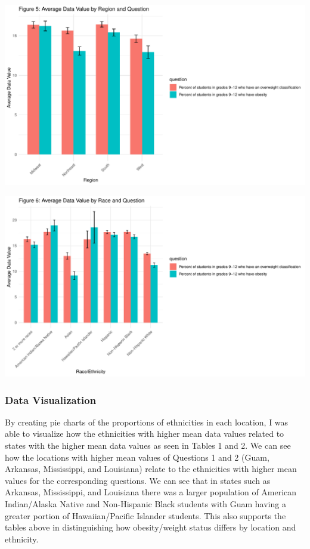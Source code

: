\documentclass[
]{article}
\begin{document}
\includegraphics{FinalPM566---Rmarkdown_files/figure-latex/unnamed-chunk-27-1.pdf}

\includegraphics{FinalPM566---Rmarkdown_files/figure-latex/unnamed-chunk-28-1.pdf}

\subsubsection{Data Visualization}\label{data-visualization}

By creating pie charts of the proportions of ethnicities in each
location, I was able to visualize how the ethnicities with higher mean
data values related to states with the higher mean data values as seen
in Tables 1 and 2. We can see how the locations with higher mean values
of Questions 1 and 2 (Guam, Arkansas, Mississippi, and Louisiana) relate
to the ethnicities with higher mean values for the corresponding
questions. We can see that in states such as Arkansas, Mississippi, and
Louisiana there was a larger population of American Indian/Alaska Native
and Non-Hispanic Black students with Guam having a greater portion of
Hawaiian/Pacific Islander students. This also supports the tables above
in distinguishing how obesity/weight status differs by location and
ethnicity.
\end{document}
